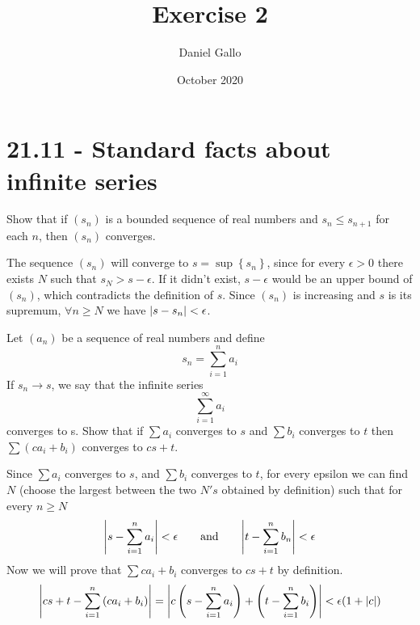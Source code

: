 \documentclass{article}
\title{Exercise 2}
\author{Daniel Gallo}
\date{October 2020}
\DeclarePairedDelimiter\abs{\lvert}{\rvert}%
\begin{document}
    \maketitle
    \section*{21.11 - Standard facts about infinite series}
    \begin{tcolorbox}[title=Exercise a]
        \label{21.11a}
        Show that if $(s_n)$ is a bounded sequence of real numbers and $s_n \leq s_{n + 1}$ for each $n$, then $(s_n)$ converges.
    \end{tcolorbox}
    \noindent
    The sequence $(s_n)$ will converge to $s = \sup\left\{s_n\right\}$, since for every $\epsilon > 0$ there exists $N$ such that $s_N > s - \epsilon$. If it didn't exist, $s - \epsilon$ would be an upper bound of $(s_n)$, which contradicts the definition of $s$. Since $(s_n)$ is increasing and $s$ is its supremum, $\forall n \geq N$ we have $\abs{s - s_n} < \epsilon$.
    \begin{tcolorbox}[title=Exercise b]
        \label{21.11b}
        Let $(a_n)$ be a sequence of real numbers and define
        \begin{equation*}
            s_n = \sum_{i=1}^n{a_i}
        \end{equation*}
        If $s_n \rightarrow s$, we say that the infinite series
        \begin{equation*}
            \sum_{i=1}^\infty{a_i}
        \end{equation*}
        converges to s. Show that if $\sum{a_i}$ converges to $s$ and $\sum{b_i}$ converges to $t$ then $\sum{(ca_i + b_i)}$ converges to $cs + t$.
    \end{tcolorbox}
    \noindent
    Since $\sum{a_i}$ converges to $s$, and $\sum{b_i}$ converges to $t$, for every epsilon we can find $N$ (choose the largest between the two $N's$ obtained by definition) such that for every $n \geq N$
    \begin{equation*}
        \abs*{s - \sum_{i=1}^n{a_i}} < \epsilon \qquad \text{and} \qquad \abs*{t - \sum_{i=1}^n{b_n}} < \epsilon
    \end{equation*}
    Now we will prove that $\sum{ca_i + b_i}$ converges to $cs + t$ by definition.
    \begin{equation*}
        \abs*{cs+t - \sum_{i=1}^n{\left(ca_i + b_i\right)}} = \abs*{c\left(s - \sum_{i=1}^n{a_i}\right) + \left(t - \sum_{i=1}^n{b_i}\right)} < \epsilon(1 + \abs{c})
    \end{equation*}
\end{document}

